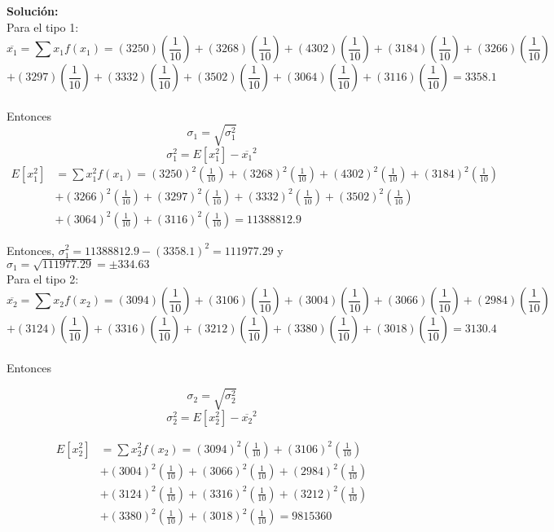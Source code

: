 \begin{enumerate}
    \textbf{Solución: } \\
    Para el tipo 1:
    $$ \overline{x_{1}} = \sum x_{1}f(x_{1})= (3250)\left( \frac{1}{10} \right) + (3268)\left( \frac{1}{10} \right) + (4302)\left( \frac{1}{10} \right) + (3184)\left( \frac{1}{10} \right) + (3266)\left( \frac{1}{10} \right) $$ $$ +  (3297)\left( \frac{1}{10} \right) + (3332)\left( \frac{1}{10} \right)+ (3502)\left( \frac{1}{10} \right) + (3064)\left( \frac{1}{10} \right) + (3116)\left( \frac{1}{10} \right) = 3358.1 $$
    \\
    Entonces
    $$ \sigma_{1} = \sqrt{\sigma_{1}^2} $$
    $$ \sigma_{1}^2 = E[x_{1}^2] - \overline{x_{1}}^2 $$
    \begin{align*}
        E[x_{1}^2] &= \sum x_{1}^2f(x_{1})= (3250)^2\left( \frac{1}{10} \right) + (3268)^2\left( \frac{1}{10} \right) + (4302)^2\left( \frac{1}{10} \right) + (3184)^2\left( \frac{1}{10} \right)\\
        &+ (3266)^2\left( \frac{1}{10} \right) +  (3297)^2\left( \frac{1}{10} \right) +(3332)^2\left( \frac{1}{10} \right)+ (3502)^2\left( \frac{1}{10} \right) \\
        &+ (3064)^2\left( \frac{1}{10} \right) + (3116)^2\left( \frac{1}{10} \right) = 11388812.9
    \end{align*}
     
    
    Entonces, $ \sigma_{1}^2 = 11388812.9 -(3358.1)^2 = 111977.29 $ y $\sigma_{1} = \sqrt{111977.29} = \pm 334.63 $ \\
    
    Para el tipo 2:
    $$ \overline{x_{2}} = \sum x_{2}f(x_{2})= (3094)\left( \frac{1}{10} \right) + (3106)\left( \frac{1}{10} \right) + (3004)\left( \frac{1}{10} \right) + (3066)\left( \frac{1}{10} \right) + (2984)\left( \frac{1}{10} \right) $$ $$ +  (3124)\left( \frac{1}{10} \right) + (3316)\left( \frac{1}{10} \right)+ (3212)\left( \frac{1}{10} \right) + (3380)\left( \frac{1}{10} \right) + (3018)\left( \frac{1}{10} \right) = 3130.4 $$
    \\
    Entonces
    
    $$ \sigma_{2} = \sqrt{\sigma_{2}^2} $$
    $$ \sigma_{2}^2 = E[x_{2}^2] - \overline{x_{2}}^2 $$
    
    \begin{align*}
    E[x_{2}^2] &= \sum x_{2}^2f(x_{2})= (3094)^2\left( \frac{1}{10} \right) + (3106)^2\left( \frac{1}{10} \right) \\
    &+ (3004)^2\left( \frac{1}{10} \right) + (3066)^2\left( \frac{1}{10} \right) + (2984)^2\left( \frac{1}{10} \right)\\ 
    &+  (3124)^2\left( \frac{1}{10} \right) +(3316)^2\left( \frac{1}{10} \right)+ (3212)^2\left( \frac{1}{10} \right)\\ 
    &+ (3380)^2\left( \frac{1}{10} \right) + (3018)^2\left( \frac{1}{10} \right) = 9815360
    \end{align*} 
    

\end{enumerate}

